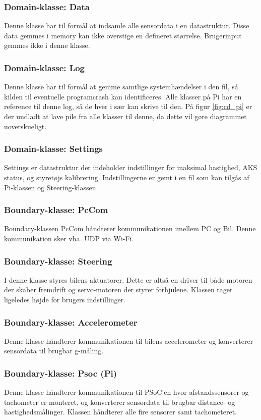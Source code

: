 \subsubsection{Domain-klasse: Data}
Denne klasse har til formål at indsamle alle sensordata i en datastruktur. Disse data gemmes i memory kan ikke overstige en defineret størrelse. Brugerinput gemmes ikke i denne klasse.

\subsubsection{Domain-klasse: Log}
Denne klasse har til formål at gemme samtlige systemhændelser i den fil, så kilden til eventuelle programcrash kan identificeres. Alle klasser på Pi har en reference til denne log, så de hver i sær kan skrive til den. På figur \ref{fig:cd_pi} er der undladt at lave pile fra alle klasser til denne, da dette vil gøre diagrammet uoverskueligt. 

\subsubsection{Domain-klasse: Settings}
Settings er datastruktur der indeholder indstillinger for maksimal hastighed, AKS status, og styretøjs kalibrering. Indstillingerne er gemt i en fil som kan tilgås af Pi-klassen og Steering-klassen.

\subsubsection{Boundary-klasse: PcCom}
Boundary-klassen PcCom håndterer kommunikationen imellem PC og Bil. Denne kommunikation sker vha. UDP via Wi-Fi.

\subsubsection{Boundary-klasse: Steering}
I denne klasse styres bilens aktuatorer. Dette er altså en driver til både motoren der skaber fremdrift og servo-motoren der styrer forhjulene. Klassen tager ligeledes højde for brugers indstillinger.

\subsubsection{Boundary-klasse: Accelerometer}
Denne klasse håndterer kommunikationen til bilens accelerometer og konverterer sensordata til brugbar g-måling.

\subsubsection{Boundary-klasse: Psoc (Pi)}
Denne klasse håndterer kommunikationen til PSoC'en hvor afstandssensorer og tachometer er monteret, og konverterer sensordata til brugbar distance- og hastighedsmålinger. Klassen håndterer alle fire sensorer samt tachometeret.

